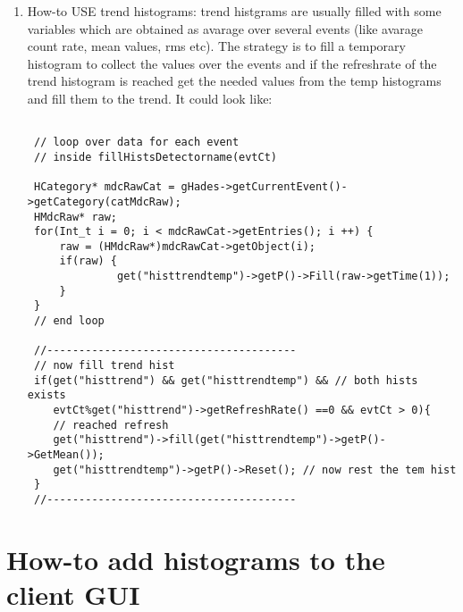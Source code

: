 \begin{enumerate}
\begin{enumerate}
    \item How-to USE trend histograms: trend histgrams are usually filled 
    with some variables which are obtained as avarage over several events 
    (like avarage count rate, mean values, rms etc). The strategy is to 
    fill a temporary histogram to collect the values over the events and 
    if the refreshrate of the trend histogram is reached get the needed 
    values from the temp histograms and fill them to the trend. It could 
    look like:
\begin{lstlisting}         
                        
 // loop over data for each event
 // inside fillHistsDetectorname(evtCt)
        
 HCategory* mdcRawCat = gHades->getCurrentEvent()->getCategory(catMdcRaw);
 HMdcRaw* raw;
 for(Int_t i = 0; i < mdcRawCat->getEntries(); i ++) {                  	
     raw = (HMdcRaw*)mdcRawCat->getObject(i);
     if(raw) {
              get("histtrendtemp")->getP()->Fill(raw->getTime(1));
     }
 }
 // end loop
                        
 //---------------------------------------
 // now fill trend hist
 if(get("histtrend") && get("histtrendtemp") && // both hists exists
    evtCt%get("histtrend")->getRefreshRate() ==0 && evtCt > 0){ 
    // reached refresh
    get("histtrend")->fill(get("histtrendtemp")->getP()->GetMean());
    get("histtrendtemp")->getP()->Reset(); // now rest the tem hist
 }
 //---------------------------------------
\end{lstlisting}         
  \end{enumerate}                 
\end{enumerate}                 
                        
                        
\section{How-to add histograms to the client GUI} 
        
